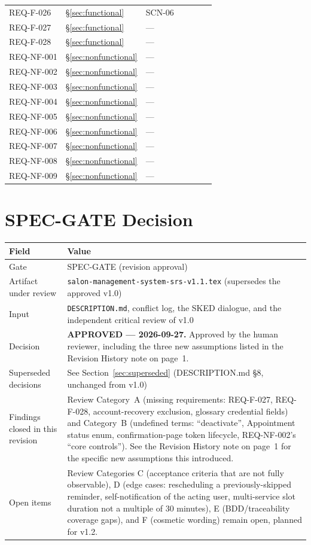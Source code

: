 \documentclass[11pt,a4paper]{article}
\begin{document}
\begin{longtable}{L{1.7cm}L{2.3cm}L{1.6cm}L{1.4cm}L{1.4cm}L{1.4cm}L{1.4cm}}
REQ-F-026 & \S\ref{sec:functional} & SCN-06 & & & & \\
REQ-F-027 & \S\ref{sec:functional} & --- & & & & \\
REQ-F-028 & \S\ref{sec:functional} & --- & & & & \\
REQ-NF-001 & \S\ref{sec:nonfunctional} & --- & & & & \\
REQ-NF-002 & \S\ref{sec:nonfunctional} & --- & & & & \\
REQ-NF-003 & \S\ref{sec:nonfunctional} & --- & & & & \\
REQ-NF-004 & \S\ref{sec:nonfunctional} & --- & & & & \\
REQ-NF-005 & \S\ref{sec:nonfunctional} & --- & & & & \\
REQ-NF-006 & \S\ref{sec:nonfunctional} & --- & & & & \\
REQ-NF-007 & \S\ref{sec:nonfunctional} & --- & & & & \\
REQ-NF-008 & \S\ref{sec:nonfunctional} & --- & & & & \\
REQ-NF-009 & \S\ref{sec:nonfunctional} & --- & & & & \\
\bottomrule
\end{longtable}

\section{SPEC-GATE Decision}
\label{sec:gate}

\begin{tabularx}{\textwidth}{@{}lX@{}}
\toprule
Field & Value \\
\midrule
Gate & SPEC-GATE (revision approval) \\
Artifact under review & \texttt{salon-management-system-srs-v1.1.tex}
  (supersedes the approved v1.0) \\
Input & \texttt{DESCRIPTION.md}, conflict log, the SKED dialogue,
  and the independent critical review of v1.0 \\
Decision & \textbf{APPROVED --- 2026-09-27.} Approved by the human
  reviewer, including the three new assumptions listed in the Revision
  History note on page~1. \\
Superseded decisions & See Section~\ref{sec:superseded} (DESCRIPTION.md
  \S8, unchanged from v1.0) \\
Findings closed in this revision & Review Category~A (missing
  requirements: REQ-F-027, REQ-F-028, account-recovery exclusion, glossary
  credential fields) and Category~B (undefined terms: ``deactivate'',
  Appointment status enum, confirmation-page token lifecycle,
  REQ-NF-002's ``core controls''). See the Revision History note on
  page~1 for the specific new assumptions this introduced. \\
Open items & Review Categories C (acceptance criteria that are not fully
  observable), D (edge cases: rescheduling a previously-skipped reminder,
  self-notification of the acting user, multi-service slot duration not a
  multiple of 30 minutes), E (BDD/traceability coverage gaps), and F
  (cosmetic wording) remain open, planned for v1.2. \\
\bottomrule
\end{tabularx}
\end{document}
